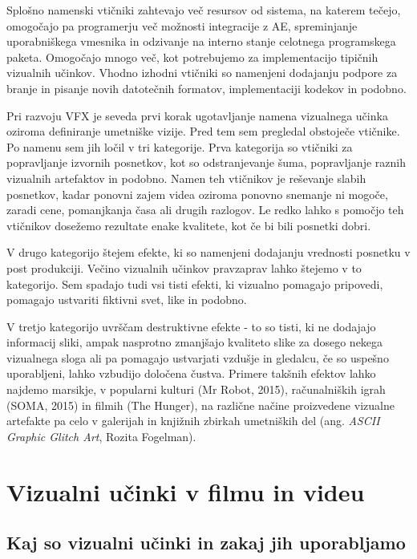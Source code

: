 \documentclass[a4paper, 12pt]{book}
\begin{document}
Splošno namenski vtičniki zahtevajo več resursov od sistema, na katerem tečejo, omogočajo pa programerju več možnosti integracije z AE, spreminjanje uporabniškega vmesnika in odzivanje na interno stanje celotnega programskega paketa. 
Omogočajo mnogo več, kot potrebujemo za implementacijo tipičnih vizualnih učinkov. 
Vhodno izhodni vtičniki so namenjeni dodajanju podpore za branje in pisanje novih datotečnih formatov, implementaciji kodekov in podobno.

Pri razvoju VFX je seveda prvi korak ugotavljanje namena vizualnega učinka oziroma definiranje umetniške vizije. 
Pred tem sem pregledal obstoječe vtičnike. 
Po namenu sem jih ločil v tri kategorije. 
Prva kategorija so vtičniki za popravljanje izvornih posnetkov, kot so odstranjevanje šuma, popravljanje raznih vizualnih artefaktov in podobno. 
Namen teh vtičnikov je reševanje slabih posnetkov, kadar ponovni zajem videa oziroma ponovno snemanje ni mogoče, zaradi cene, pomanjkanja časa ali drugih razlogov. 
Le redko lahko s pomočjo teh vtičnikov dosežemo rezultate enake kvalitete, kot če bi bili posnetki dobri. 

V drugo kategorijo štejem efekte, ki so namenjeni dodajanju vrednosti posnetku v post produkciji. 
Večino vizualnih učinkov pravzaprav lahko štejemo v to kategorijo. 
Sem spadajo tudi vsi tisti efekti, ki vizualno pomagajo pripovedi, pomagajo ustvariti fiktivni svet, like in podobno. 

V tretjo kategorijo uvrščam destruktivne efekte - to so tisti, ki ne dodajajo informacij sliki, ampak nasprotno zmanjšajo kvaliteto slike za dosego nekega vizualnega sloga ali pa pomagajo ustvarjati vzdušje in gledalcu, če so uspešno uporabljeni, lahko vzbudijo določena čustva. 
Primere takšnih efektov lahko najdemo marsikje, v popularni kulturi (Mr Robot, 2015), %
računalniških igrah (SOMA, 2015) %
 in filmih (The Hunger), %
na različne načine proizvedene vizualne artefakte pa celo v galerijah in knjižnih zbirkah umetniških del (ang. {\it ASCII Graphic Glitch Art}, Rozita Fogelman).



\chapter{Vizualni učinki v filmu in videu}

\section{Kaj so vizualni učinki in zakaj jih uporabljamo}
\end{document}
